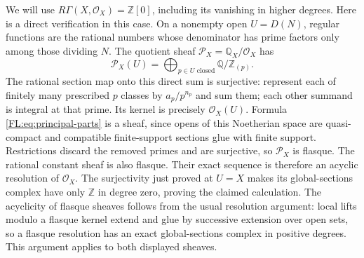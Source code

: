 \documentclass[11pt,a4paper]{article}
\theoremstyle{definition}\newtheorem{definition}[theorem]{Definition}
\providecommand{\PP}{\mathcal P}
\providecommand{\RQ}{\mathbb Q}
\begin{document}
We will use $R\Gamma(X,\mathcal O_X)=\mathbb Z[0]$, including its
vanishing in higher degrees. Here is a direct verification in this
case. On a nonempty open $U=D(N)$, regular functions are the rational
numbers whose denominator has prime factors only among those dividing
$N$. The quotient sheaf $\PP_X=\RQ_X/\mathcal O_X$ has
\[
 \PP_X(U)=\bigoplus_{p\in U\text{ closed}}\RQ/\mathbb Z_{(p)}.
 \tag{FL18}\label{FL:eq:principal-parts}
\]
The rational section map onto this direct sum is surjective: represent
each of finitely many prescribed $p$ classes by $a_p/p^{n_p}$ and
sum them; each other summand is integral at that prime. Its kernel
is precisely $\mathcal O_X(U)$. Formula \eqref{FL:eq:principal-parts}
is a sheaf, since opens of this Noetherian space are quasi-compact
and compatible finite-support sections glue with finite support.
Restrictions discard the removed primes and are surjective, so
$\PP_X$ is flasque. The rational constant sheaf is also flasque.
Their exact sequence is therefore an acyclic resolution of
$\mathcal O_X$. The surjectivity just proved at $U=X$ makes its
global-sections complex have only $\mathbb Z$ in degree zero, proving
the claimed calculation. The acyclicity of flasque sheaves follows
from the usual resolution argument: local lifts modulo a flasque
kernel extend and glue by successive extension over open sets, so a
flasque resolution has an exact global-sections complex in positive
degrees. This argument applies to both displayed sheaves.
\end{document}
